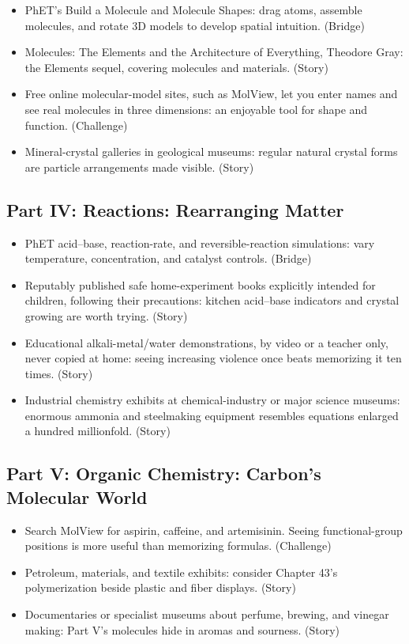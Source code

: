 \begin{itemize}[itemsep=2pt]
\item PhET's Build a Molecule and Molecule Shapes: drag atoms, assemble molecules, and rotate 3D models to develop spatial intuition. (Bridge)
\item Molecules: The Elements and the Architecture of Everything, Theodore Gray: the Elements sequel, covering molecules and materials. (Story)
\item Free online molecular-model sites, such as MolView, let you enter names and see real molecules in three dimensions: an enjoyable tool for shape and function. (Challenge)
\item Mineral-crystal galleries in geological museums: regular natural crystal forms are particle arrangements made visible. (Story)
\end{itemize}

\subsection*{Part IV: Reactions: Rearranging Matter}

\begin{itemize}[itemsep=2pt]
\item PhET acid--base, reaction-rate, and reversible-reaction simulations: vary temperature, concentration, and catalyst controls. (Bridge)
\item Reputably published safe home-experiment books explicitly intended for children, following their precautions: kitchen acid--base indicators and crystal growing are worth trying. (Story)
\item Educational alkali-metal/water demonstrations, by video or a teacher only, never copied at home: seeing increasing violence once beats memorizing it ten times. (Story)
\item Industrial chemistry exhibits at chemical-industry or major science museums: enormous ammonia and steelmaking equipment resembles equations enlarged a hundred millionfold. (Story)
\end{itemize}

\subsection*{Part V: Organic Chemistry: Carbon's Molecular World}

\begin{itemize}[itemsep=2pt]
\item Search MolView for aspirin, caffeine, and artemisinin. Seeing functional-group positions is more useful than memorizing formulas. (Challenge)
\item Petroleum, materials, and textile exhibits: consider Chapter 43's polymerization beside plastic and fiber displays. (Story)
\item Documentaries or specialist museums about perfume, brewing, and vinegar making: Part V's molecules hide in aromas and sourness. (Story)
\end{itemize}

